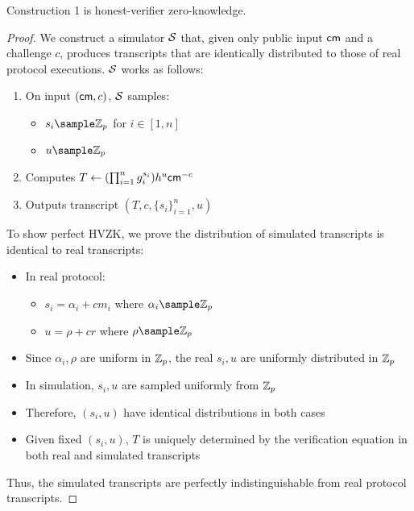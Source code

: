 {\begin{theorem}
    Construction 1 is honest-verifier zero-knowledge.
\end{theorem}
\begin{proof}
    We construct a simulator $\mathcal{S}$ that, given only public input $\mathsf{cm}$ and a challenge $c$, produces transcripts that are identically distributed to those of real protocol executions. $\mathcal{S}$ works as follows:
    \begin{enumerate}
        \item On input $(\mathsf{cm}, c)$, $\mathcal{S}$ samples:
            \begin{itemize}
                \item $s_i \sample \Z_p$ for $i \in [1,n]$
                \item $u \sample \Z_p$
            \end{itemize}
            
        \item Computes $T \gets (\prod_{i=1}^n g_i^{s_i})h^u\mathsf{cm}^{-c}$
        
        \item Outputs transcript $(T, c, \{s_i\}_{i=1}^n, u)$
    \end{enumerate}

    To show perfect HVZK, we prove the distribution of simulated transcripts is identical to real transcripts:
    \begin{itemize}
        \item In real protocol: 
            \begin{itemize}
                \item $s_i = \alpha_i + cm_i$ where $\alpha_i \sample \Z_p$
                \item $u = \rho + cr$ where $\rho \sample \Z_p$
            \end{itemize}
        \item Since $\alpha_i, \rho$ are uniform in $\mathbb{Z}_p$, the real $s_i, u$ are uniformly distributed in $\mathbb{Z}_p$
        \item In simulation, $s_i, u$ are sampled uniformly from $\mathbb{Z}_p$
        \item Therefore, $(s_i, u)$ have identical distributions in both cases
        \item Given fixed $(s_i, u)$, $T$ is uniquely determined by the verification equation in both real and simulated transcripts
    \end{itemize}
    Thus, the simulated transcripts are perfectly indistinguishable from real protocol transcripts.
\end{proof}


}
